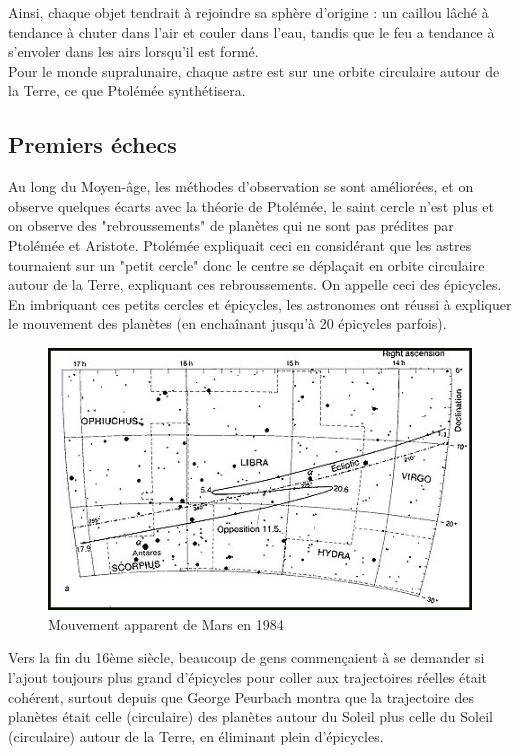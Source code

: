 \documentclass{classe}
\begin{document}
Ainsi, chaque objet tendrait à rejoindre sa sphère d'origine : un caillou lâché à tendance à chuter dans l'air et couler dans l'eau, tandis que le feu a tendance à s'envoler dans les airs lorsqu'il est formé.\\

Pour le monde supralunaire, chaque astre est sur une orbite circulaire autour de la Terre, ce que Ptolémée synthétisera.

\subsection{Premiers échecs}

Au long du Moyen-âge, les méthodes d'observation se sont améliorées, et on observe quelques écarts avec la théorie de Ptolémée, le saint cercle n'est plus et on observe des "rebroussements" de planètes qui ne sont pas prédites par Ptolémée et Aristote. Ptolémée expliquait ceci en considérant que les astres tournaient sur un "petit cercle" donc le centre se déplaçait en orbite circulaire autour de la Terre, expliquant ces rebroussements. On appelle ceci des épicycles. En imbriquant ces petits cercles et épicycles, les astronomes ont réussi à expliquer le mouvement des planètes (en enchaînant jusqu'à 20 épicycles parfois).

\begin{figure}[H]
\includegraphics[scale=1.5]{Mars.jpg}
\centering
\caption{Mouvement apparent de Mars en 1984}
\end{figure}

Vers la fin du 16ème siècle, beaucoup de gens commençaient à se demander si l'ajout toujours plus grand d'épicycles pour coller aux trajectoires réelles était cohérent, surtout depuis que George Peurbach montra que la trajectoire des planètes était celle (circulaire) des planètes autour du Soleil plus celle du Soleil (circulaire) autour de la Terre, en éliminant plein d'épicycles.\\
\end{document}
